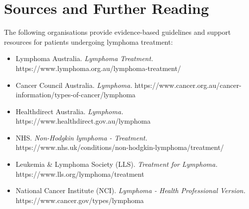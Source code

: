 \section*{Sources and Further Reading}
The following organisations provide evidence-based guidelines and support resources for patients undergoing lymphoma treatment:
\begin{itemize}
    \item Lymphoma Australia. \textit{Lymphoma Treatment.} https://www.lymphoma.org.au/lymphoma-treatment/
    \item Cancer Council Australia. \textit{Lymphoma.} https://www.cancer.org.au/cancer-information/types-of-cancer/lymphoma
    \item Healthdirect Australia. \textit{Lymphoma.} https://www.healthdirect.gov.au/lymphoma
    \item NHS. \textit{Non-Hodgkin lymphoma - Treatment.} https://www.nhs.uk/conditions/non-hodgkin-lymphoma/treatment/
    \item Leukemia \& Lymphoma Society (LLS). \textit{Treatment for Lymphoma.} https://www.lls.org/lymphoma/treatment
    \item National Cancer Institute (NCI). \textit{Lymphoma - Health Professional Version.} https://www.cancer.gov/types/lymphoma
\end{itemize}
